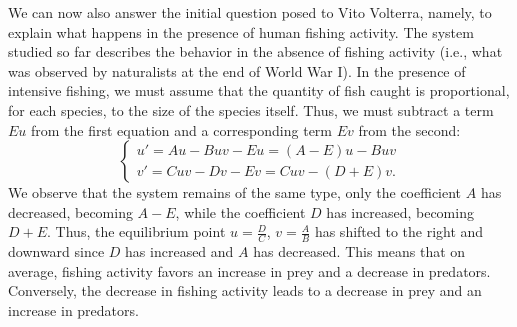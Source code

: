 We can now also answer the initial question posed to Vito Volterra, namely, to
explain what happens in the presence of human fishing activity. The system
studied so far describes the behavior in the absence of fishing activity (i.e.,
what was observed by naturalists at the end of World War I). In the presence of
intensive fishing, we must assume that the quantity of fish caught is
proportional, for each species, to the size of the species itself. Thus, we must
subtract a term $Eu$ from the first equation and a corresponding term $Ev$ from
the second:
\begin{equation}
  \begin{cases}
    u' = A u - B u v - Eu = (A-E) u - B uv\\
    v' = C u v - D v - Ev = C uv - (D+E) v.
  \end{cases}
\end{equation}
We observe that the system remains of the same type, only the coefficient $A$
has decreased, becoming $A-E$, while the coefficient $D$ has increased, becoming
$D+E$. Thus, the equilibrium point $u=\frac DC$, $v=\frac AB$ has shifted to the
right and downward since $D$ has increased and $A$ has decreased. This means
that on average, fishing activity favors an increase in prey and a decrease in
predators. Conversely, the decrease in fishing activity leads to a decrease in
prey and an increase in predators.